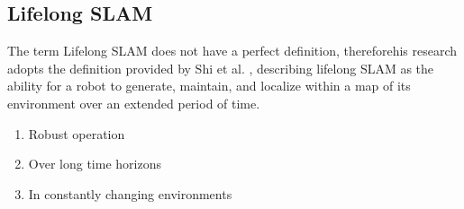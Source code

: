 \subsection{Lifelong SLAM}

The term Lifelong SLAM does not have a perfect definition, thereforehis research adopts the definition provided by Shi et al. \cite{shiAreWeReady2020}, describing lifelong SLAM as the ability for a robot to generate, maintain, and localize within a map of its environment over an extended period of time. 
\begin{singlespace}
    \begin{enumerate}
        \item Robust operation
        \item Over long time horizons
        \item In constantly changing environments
    \end{enumerate}
\end{singlespace}